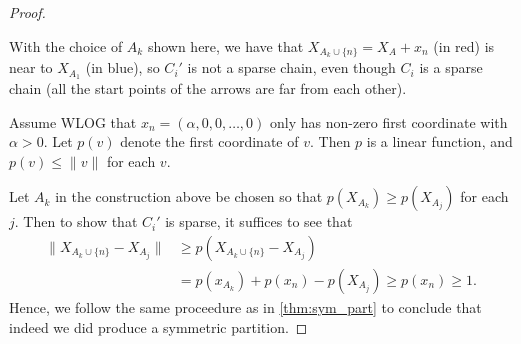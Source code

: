 \begin{proof}
\begin{marginfigure}[-3cm]
\caption{With the choice of $A_k$ shown here, we have that $X_{A_k \cup \{n\}} = X_A + x_n$ (in red) is near to $X_{A_1}$ (in blue), so $C_i'$ is not a sparse chain, even though $C_i$ is a sparse chain (all the start points of the arrows are far from each other).} \label{fig:LO_proof_prob}

\end{marginfigure}
Assume WLOG that $x_n = (\alpha,0,0,\dotsc,0)$ only has non-zero first coordinate with $\alpha>0$. Let $p(v)$ denote the first coordinate of $v$. Then $p$ is a linear function, and $p(v) \leq \|v\|$ for each $v$. 

Let $A_k$ in the construction above be chosen so that $p(X_{A_k})\geq p(X_{A_j})$ for each $j$. Then to show that $C_i'$ is sparse, it suffices to see that
\begin{align*}	
\|X_{A_k \cup\{n\}} - X_{A_j}\| &\geq p( X_{A_k \cup \{n\}} - X_{A_j})\\
&= p(x_{A_k}) + p(x_n) - p(X_{A_j})\geq p(x_n)\geq 1.
\end{align*}
Hence, we follow the same proceedure as in \cref{thm:sym_part} to conclude that indeed we did produce a symmetric partition.
\end{proof}


